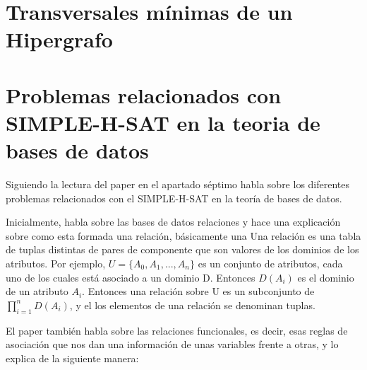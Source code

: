 \documentclass{cosas/tfg_domingo}
\begin{document}
%

\begin{center}








\end{center}

\section{Transversales mínimas de un Hipergrafo}

\newpage
\section{Problemas relacionados con SIMPLE-H-SAT en la teoria de bases de datos}

Siguiendo la lectura del paper \citep{Thomas} en el apartado séptimo habla sobre los diferentes problemas relacionados con el SIMPLE-H-SAT en la teoría de bases de datos.

Inicialmente, habla sobre las bases de datos relaciones y hace una explicación sobre como esta formada una relación, básicamente una
Una relación es una tabla de tuplas distintas de pares de componente que son valores de los dominios de los atributos. Por ejemplo, $U = \{A_0,A_1,...,A_n\}$ es un conjunto de atributos, cada uno de los cuales está asociado a un dominio D. Entonces $D(A_i)$ es el dominio de un atributo $A_i$. 
Entonces una relación sobre U es un subconjunto de $\prod_{i=1}^{n}D(A_i)$, y el los elementos de una relación se denominan tuplas.

El paper también habla sobre las relaciones funcionales, es decir, esas reglas de asociación que nos dan una información de unas variables frente a otras, y lo explica de la siguiente manera:
\end{document}
